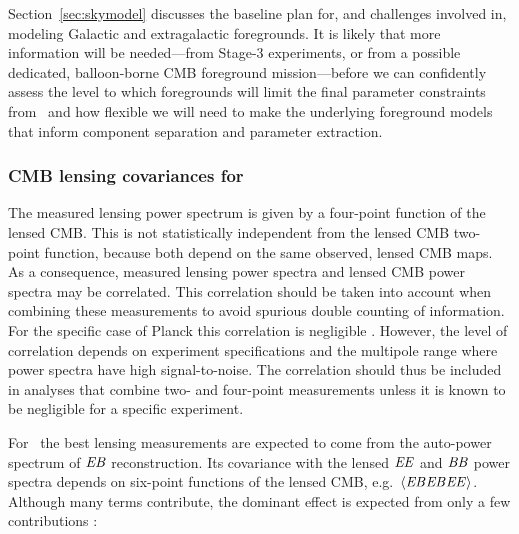 Section~\ref{sec:skymodel} discusses the baseline plan for, and challenges involved in, modeling
Galactic and extragalactic foregrounds. It is likely that more information will be needed---from 
Stage-3 experiments, or from a possible dedicated, balloon-borne CMB foreground mission---before
we can confidently assess the level to which foregrounds will limit the final parameter constraints
from \cmbexp\ and how flexible we will need to make the underlying foreground models that 
inform component separation and parameter extraction. 

\subsubsection{CMB lensing covariances for \cmbexp }
\label{se:covs}

The measured lensing power spectrum is given by a four-point function of the lensed CMB.  This is not statistically independent from the lensed CMB two-point function, because both depend on the same observed, lensed CMB maps.  As a consequence, measured lensing power spectra and lensed CMB power spectra may be correlated.  This correlation should be taken into account when combining these measurements to avoid spurious double counting of information.  For the specific case of Planck this correlation is negligible  \cite{Schmittfull:2013uea}.  However, the level of correlation depends on experiment specifications and the multipole range where power spectra have high signal-to-noise.  The correlation should thus be included in analyses that combine two- and four-point measurements unless it is known to be negligible for a specific experiment. 

For \cmbexp\, the best lensing measurements are expected to come from the auto-power spectrum of $\mathit{EB}$ reconstruction.  Its covariance with the lensed $\mathit{EE}$ and $\mathit{BB}$ power spectra depends on six-point functions of the lensed CMB, e.g.~$\langle \mathit{EB}\mathit{EB}\mathit{EE} \rangle$. Although many terms contribute, the dominant effect is expected from only a few contributions \cite{Schmittfull:2013uea}:  

